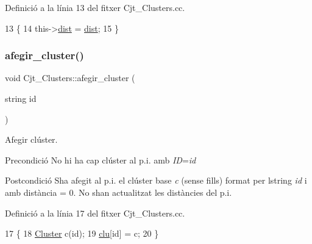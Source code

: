 Definició a la línia 13 del fitxer Cjt\+\_\+\+Clusters.\+cc.


\begin{DoxyCode}
13                                                                                      \{
14     this->\hyperlink{class_cjt___clusters_afde449634787205786301b40e053fe91}{dist} = \hyperlink{class_cjt___clusters_afde449634787205786301b40e053fe91}{dist};
15 \}
\end{DoxyCode}
\mbox{\label{class_cjt___clusters_a195166b0ac52530dadc9c883c206a01c}} 
\subsubsection{\texorpdfstring{afegir\+\_\+cluster()}{afegir\_cluster()}}
{\footnotesize\ttfamily void Cjt\+\_\+\+Clusters\+::afegir\+\_\+cluster (\begin{DoxyParamCaption}\item[{string}]{id }\end{DoxyParamCaption})}



Afegir clúster. 

\begin{DoxyPrecond}{Precondició}
No hi ha cap clúster al p.\+i. amb {\itshape ID}={\itshape id} 
\end{DoxyPrecond}
\begin{DoxyPostcond}{Postcondició}
S\textquotesingle{}ha afegit al p.\+i. el clúster base {\itshape c} (sense fills) format per l\textquotesingle{}string {\itshape id} i amb distància = 0. No s\textquotesingle{}han actualitzat les distàncies del p.\+i. 
\end{DoxyPostcond}


Definició a la línia 17 del fitxer Cjt\+\_\+\+Clusters.\+cc.


\begin{DoxyCode}
17                                            \{
18     \hyperlink{class_cluster}{Cluster} c(\textcolor{keywordtype}{id});
19     \hyperlink{class_cjt___clusters_a86fd6089c4e49eaedea86d5ec4ee6495}{clu}[id] = c;
20 \}
\end{DoxyCode}
\mbox{\label{class_cjt___clusters_a2f8e0a00fc5a706ebdd71dc0c42c5c76}} 
